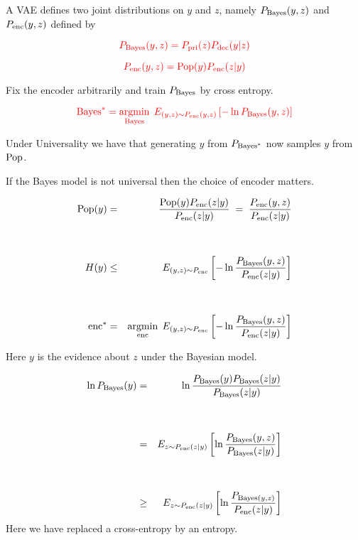 {

A VAE defines two joint distributions on $y$ and $z$, namely $P_{\mathrm{Bayes}}(y,z)$ and $P_{\mathrm{enc}}(y,z)$ defined by

\vfill
$${\color{red} P_{\mathrm{Bayes}}(y,z) = P_{\mathrm{pri}}(z)P_{\mathrm{dec}}(y|z)}$$

\vfill
$${\color{red} P_{\mathrm{enc}}(y,z) = \mathrm{Pop}(y)P_{\mathrm{enc}}(z|y)}$$


Fix the encoder arbitrarily and train $P_{\mathrm{Bayes}}$ by cross entropy.

$${\color{red}\mathrm{Bayes}^* = \operatorname*{argmin}_{\mathrm{Bayes}}\;E_{(y,z) \sim P_{\mathrm{enc}}(y,z)}\left[-\ln P_{\mathrm{Bayes}}(y,z)\right]}$$

\vfill
Under Universality we have that generating $y$ from $P_{\mathrm{Bayes}^*}$ now samples $y$ from $\mathrm{Pop}$.


If the Bayes model is not universal then the choice of encoder matters.

{\color{red}
\begin{eqnarray*}
\mathrm{Pop}(y) & = & \frac{\mathrm{Pop}(y)P_{\mathrm{enc}}(z|y)}{P_{\mathrm{enc}}(z|y)} \;=\; \frac{P_{\mathrm{enc}}(y,z)}{P_{\mathrm{enc}}(z|y)} \\ \\
\\
H(y) & \leq & E_{(y,z) \sim P_{\mathrm{enc}}}\left[ - \ln \frac{P_{\mathrm{Bayes}}(y,z)}{P_{\mathrm{enc}}(z|y)}\right] \\
\\
\\
\mathrm{enc}^* & = & \operatorname*{argmin}_{\mathrm{enc}}\;E_{(y,z) \sim P_{\mathrm{enc}}}\left[ - \ln \frac{P_{\mathrm{Bayes}}(y,z)}{P_{\mathrm{enc}}(z|y)}\right]
\end{eqnarray*}
}

Here $y$ is the evidence about $z$ under the Bayesian model.

{\color{red}
{\huge
\begin{eqnarray*}
\ln P_{\mathrm{Bayes}}(y) & =  & \ln \frac{P_{\mathrm{Bayes}}(y)P_{\mathrm{Bayes}}(z|y)}{P_{\mathrm{Bayes}}(z|y)} \\
\\
\\
& = & E_{z \sim P_{\mathrm{enc}}(z|y)} \left[\ln \frac{P_{\mathrm{Bayes}}(y,z)}{P_{\mathrm{Bayes}}(z|y)}\right] \\
\\
\\
& \geq & E_{z \sim P_{\mathrm{enc}}(z|y)}\left[\ln \frac{P_{\mathrm{Bayes}(y,z)}}{P_{\mathrm{enc}}(z|y)}\right] \\
\end{eqnarray*}
}}
Here we have replaced a cross-entropy by an entropy.

}
